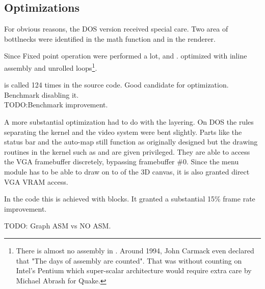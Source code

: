 \subsection{Optimizations}
For obvious reasons, the DOS version received special care. Two area of bottlnecks were identified in the math function and in the renderer.\\
\par
Since Fixed point operation were performed a lot,  and  .  optimized with inline assembly and unrolled loops\footnote{There is almost no assembly in \doom. Around 1994, John Carmack even declared that "The days of assembly are counted". That was without counting on Intel's Pentium which super-scalar architecture would require extra care by Michael Abrash for Quake.}.\\
\par
{} is called 124 times in the source code. Good candidate for optimization. Benchmark disabling it.\\
TODO:Benchmark improvement.\\
\par
A more substantial optimization had to do with the layering. On DOS the rules separating the kernel and the video system were bent slightly. Parts like the status bar and the auto-map still function as originally designed but the drawing routines in the kernel such as  and  are given privileged. They are able to access the VGA framebuffer discretely, bypassing framebuffer \#0. Since the menu module has to be able to draw on to of the 3D canvas, it is also granted direct VGA VRAM access.\\
\par
In the code this is achieved with  blocks. It granted a substantial 15\% frame rate improvement.\\
 \par 
TODO: Graph ASM vs NO ASM.\\
 \par
\par




